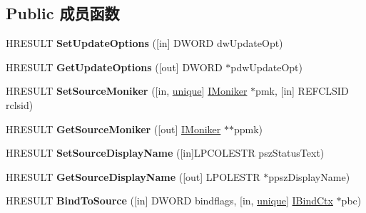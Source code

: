 \subsection*{Public 成员函数}
\begin{DoxyCompactItemize}
\item 
\mbox{\label{interface_i_ole_link_ac2ef03a5b73de5f62b9e83d3ab321ee4}} 
H\+R\+E\+S\+U\+LT {\bfseries Set\+Update\+Options} (\mbox{[}in\mbox{]} D\+W\+O\+RD dw\+Update\+Opt)
\item 
\mbox{\label{interface_i_ole_link_a9eca170f2ed7398c02dc89c59a120e4d}} 
H\+R\+E\+S\+U\+LT {\bfseries Get\+Update\+Options} (\mbox{[}out\mbox{]} D\+W\+O\+RD $\ast$pdw\+Update\+Opt)
\item 
\mbox{\label{interface_i_ole_link_a713941d7595cfeeb59a228d68b6efaf9}} 
H\+R\+E\+S\+U\+LT {\bfseries Set\+Source\+Moniker} (\mbox{[}in, \hyperlink{interfaceunique}{unique}\mbox{]} \hyperlink{interface_i_moniker}{I\+Moniker} $\ast$pmk, \mbox{[}in\mbox{]} R\+E\+F\+C\+L\+S\+ID rclsid)
\item 
\mbox{\label{interface_i_ole_link_a91a486d3d8a041581766dd1858d8734f}} 
H\+R\+E\+S\+U\+LT {\bfseries Get\+Source\+Moniker} (\mbox{[}out\mbox{]} \hyperlink{interface_i_moniker}{I\+Moniker} $\ast$$\ast$ppmk)
\item 
\mbox{\label{interface_i_ole_link_a5b01f5caca0a6ae7fe1431a94c2ae389}} 
H\+R\+E\+S\+U\+LT {\bfseries Set\+Source\+Display\+Name} (\mbox{[}in\mbox{]}L\+P\+C\+O\+L\+E\+S\+TR psz\+Status\+Text)
\item 
\mbox{\label{interface_i_ole_link_a3027821fac6db00b68267268687308a6}} 
H\+R\+E\+S\+U\+LT {\bfseries Get\+Source\+Display\+Name} (\mbox{[}out\mbox{]} L\+P\+O\+L\+E\+S\+TR $\ast$ppsz\+Display\+Name)
\item 
\mbox{\label{interface_i_ole_link_a4787f297aa6d1322306f840cfe46be36}} 
H\+R\+E\+S\+U\+LT {\bfseries Bind\+To\+Source} (\mbox{[}in\mbox{]} D\+W\+O\+RD bindflags, \mbox{[}in, \hyperlink{interfaceunique}{unique}\mbox{]} \hyperlink{interface_i_bind_ctx}{I\+Bind\+Ctx} $\ast$pbc)
\item 
$$
\end{DoxyCompactItemize}
